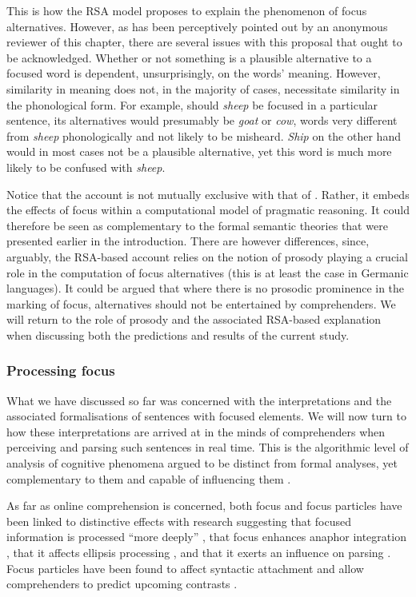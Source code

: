 \documentclass[output=paper,colorlinks,citecolor=brown]{langscibook}
\begin{document}
This is how the RSA model proposes to explain the phenomenon of focus alternatives. However, as has been perceptively pointed out by an anonymous reviewer of this chapter, there are several issues with this proposal that ought to be acknowledged. Whether or not something is a plausible alternative to a focused word is dependent, unsurprisingly, on the words' meaning. However, similarity in meaning does not, in the majority of cases, necessitate similarity in the phonological form. For example, should \textit{sheep} be focused in a particular sentence, its alternatives would presumably be \textit{goat} or \textit{cow}, words very different from \textit{sheep} phonologically and not likely to be misheard. \textit{Ship} on the other hand would in most cases not be a plausible alternative, yet this word is much more likely to be confused with \textit{sheep}.

Notice that the account is not mutually exclusive with that of \citet{rooth1992}. Rather, it embeds the effects of focus within a computational model of pragmatic reasoning. It could therefore be seen as complementary to the formal semantic theories that were presented earlier in the introduction. There are however differences, since, arguably, the RSA-based account relies on the notion of prosody playing a crucial role in the computation of focus alternatives (this is at least the case in Germanic languages). It could be argued that where there is no prosodic prominence in the marking of focus, alternatives should not be entertained by comprehenders. We will return to the role of prosody and the associated RSA-based explanation when discussing both the predictions and results of the current study.

\subsubsection{Processing focus}
What we have discussed so far was concerned with the interpretations and the associated formalisations of sentences with focused elements. We will now turn to how these interpretations are arrived at in the minds of comprehenders when perceiving and parsing such sentences in real time. This is the algorithmic level of analysis of cognitive phenomena \citep{marr2010vision} argued to be distinct from formal analyses, yet complementary to them and capable of influencing them \citep{love2015algorithmic}.

As far as online comprehension is concerned, both focus
and focus particles have been linked to distinctive effects with research suggesting that focused information is processed “more deeply” \citep{sturt2004linguistic,ward2007linguistic}, that focus enhances anaphor integration \citep{klin2004readers,sanford2009enhancement}, that it affects ellipsis processing \citep{frazier2007focus,carlson2015clefting}, and that it exerts an influence on parsing \citep{filik2005parsing}. Focus particles have been found to affect syntactic attachment \citep{carlson2022focus} and allow comprehenders to predict upcoming contrasts \citep{Carlson2013}.
\end{document}
